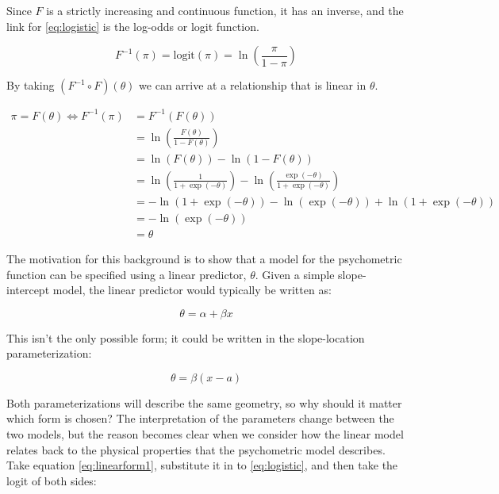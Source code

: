 \documentclass[11pt, oneside, openany]{scrbook}
\begin{document}
Since \(F\) is a strictly increasing and continuous function, it has an inverse, and the link for \eqref{eq:logistic} is the log-odds or logit function.

\begin{equation}
  F^{-1}(\pi) = \mathrm{logit}(\pi) = \ln\left(\frac{\pi}{1 - \pi}\right)
  \label{eq:logit}
\end{equation}

By taking \((F^{-1} \circ F)(\theta)\) we can arrive at a relationship that is linear in \(\theta\).


\begin{align*}
  \pi = F(\theta) \Longleftrightarrow F^{-1}(\pi) &= F^{-1}(F(\theta)) \\
  & = \ln\left(\frac{F(\theta)}{1 - F(\theta)}\right) \\
  &= \ln(F(\theta)) - \ln(1 - F(\theta)) \\
  &= \ln\left(\frac{1}{1 + \exp(-\theta)}\right) - \ln\left(\frac{\exp(-\theta)}{1 + \exp(-\theta)}\right) \\
  &= - \ln(1 + \exp(-\theta)) - \ln(\exp(-\theta)) + \ln(1 + \exp(-\theta)) \\
  &= - \ln(\exp(-\theta)) \\
  &= \theta
\end{align*}

The motivation for this background is to show that a model for the psychometric function can be specified using a linear predictor, \(\theta\). Given a simple slope-intercept model, the linear predictor would typically be written as:

\begin{equation}
  \theta = \alpha + \beta x
  \label{eq:linearform1}
\end{equation}

This isn't the only possible form; it could be written in the slope-location parameterization:

\begin{equation}
  \theta = \beta(x - a)
  \label{eq:linearform2}
\end{equation}

Both parameterizations will describe the same geometry, so why should it matter which form is chosen? The interpretation of the parameters change between the two models, but the reason becomes clear when we consider how the linear model relates back to the physical properties that the psychometric model describes. Take equation \eqref{eq:linearform1}, substitute it in to \eqref{eq:logistic}, and then take the logit of both sides:
\end{document}
